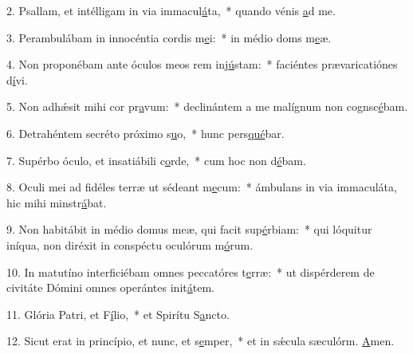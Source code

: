 2. Psallam, et intélligam in via immacul\uline{á}ta,~* quando vénis \uline{a}d me.\par 
3. Perambulábam in innocéntia cordis m\uline{e}i:~* in médio doms m\uline{e}æ.\par 
4. Non proponébam ante óculos meos rem inj\uline{ú}stam:~* faciéntes prævaricatiónes d\uline{í}vi.\par 
5. Non adhǽsit mihi cor pr\uline{a}vum:~* declinántem a me malígnum non cognsc\uline{é}bam.\par 
6. Detrahéntem secréto próximo s\uline{u}o,~* hunc pers\uline{qué}bar.\par 
7. Supérbo óculo, et insatiábili c\uline{o}rde,~* cum hoc non d\uline{é}bam.\par 
8. Oculi mei ad fidéles terræ ut sédeant m\uline{e}cum:~* ámbulans in via immaculáta, hic mihi minstr\uline{á}bat.\par 
9. Non habitábit in médio domus meæ, qui facit sup\uline{é}rbiam:~* qui lóquitur iníqua, non diréxit in conspéctu oculórum m\uline{ó}rum.\par 
10. In matutíno interficiébam omnes peccatóres t\uline{e}rræ:~* ut dispérderem de civitáte Dómini omnes operántes init\uline{á}tem.\par 
11. Glória Patri, et F\uline{í}lio,~* et Spirítu S\uline{a}ncto.\par 
12. Sicut erat in princípio, et nunc, et s\uline{e}mper,~* et in sǽcula sæculórm. \uline{A}men.\par 
